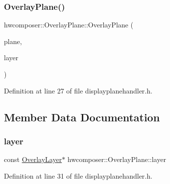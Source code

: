 \subsubsection{\texorpdfstring{Overlay\+Plane()}{OverlayPlane()}}
{\footnotesize\ttfamily hwcomposer\+::\+Overlay\+Plane\+::\+Overlay\+Plane (\begin{DoxyParamCaption}\item[{\mbox{\hyperlink{classhwcomposer_1_1DisplayPlane}{Display\+Plane}} $\ast$}]{plane,  }\item[{const \mbox{\hyperlink{structhwcomposer_1_1OverlayLayer}{Overlay\+Layer}} $\ast$}]{layer }\end{DoxyParamCaption})\hspace{0.3cm}{\ttfamily [inline]}}



Definition at line 27 of file displayplanehandler.\+h.


\begin{DoxyCode}{0}
\end{DoxyCode}


\subsection{Member Data Documentation}
\mbox{\label{structhwcomposer_1_1OverlayPlane_a8780236232b7473f1b208db5969b18a1}} 
\subsubsection{\texorpdfstring{layer}{layer}}
{\footnotesize\ttfamily const \mbox{\hyperlink{structhwcomposer_1_1OverlayLayer}{Overlay\+Layer}}$\ast$ hwcomposer\+::\+Overlay\+Plane\+::layer}



Definition at line 31 of file displayplanehandler.\+h.

